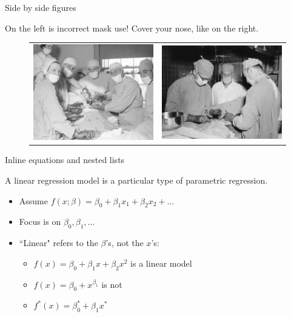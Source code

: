 \documentclass{beamer}
\begin{document}
\begin{frame}[fragile]{Side by side figures}

On the left is incorrect mask use! Cover your nose, like on the right.

\begin{figure}[h]
  \centering
     \begin{tabular}{cc}
       \includegraphics[width=.4\textwidth]{./figs/a0104} &
       \includegraphics[width=.4\textwidth]{./figs/a0341}
     \end{tabular}
\end{figure}

\end{frame}




\begin{frame}{Inline equations and nested lists}

A linear regression model is a particular type of parametric regression.

\begin{itemize}
	\item Assume $f(x; \beta) = \beta_0 + \beta_1 x_1 + \beta_2 x_2 + \ldots$
	\item Focus is on $\beta_0, \beta_1, \ldots$
	\item ``Linear" refers to the $\beta$'s, not the $x$'s: 
	\begin{itemize}
		\item $f(x) = \beta_0 + \beta_1 x + \beta_2 x^2$ is a linear model
		\item $f(x) = \beta_0 + x^{\beta_1}$ is not
		\item $f^{*}(x) = \beta_0^{*} + \beta_1 x^{*}$
	\end{itemize}
\end{itemize}

\end{frame}
\end{document}
